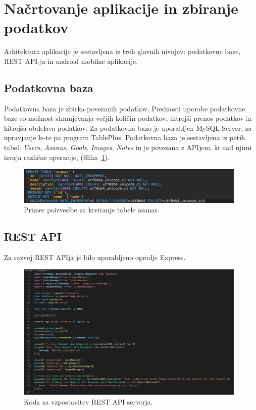 \documentclass[a4paper, 12pt]{book}
\begin{document}
\section{Načrtovanje aplikacije in zbiranje podatkov}
Arhitektura aplikacije je sestavljena iz treh glavnih nivojev: podatkovne baze, REST API-ja in android mobilne aplikacije.

\subsection{Podatkovna baza}
Podatkovna baza je zbirka povezanih podatkov. Prednosti uporabe podatkovne baze so možnost shranjevanja večjih količin podatkov, hitrejši prenos podatkov in hitrejša obdelava podatkov. Za podatkovno bazo je uporabljen MySQL Server, za upravjanje le-te pa program TablePlus. Podatkovna baza je sestavljena iz petih tabel: \textit{Users}, \textit{Asanas}, \textit{Goals}, \textit{Images}, \textit{Notes} in je povezana z APIjem, ki nad njimi izvaja različne operacije, (Slika~\ref{query}).

\begin{figure}[htbp]
\begin{center}
\includegraphics[scale=.55]{query.jpg}
\end{center}
\caption{Primer poizvedbe za kreiranje tabele asanas.}
\label{query}
\end{figure}

\subsection{REST API}
Za razvoj REST APIja je bilo uporabljeno ogrodje Express. 

\begin{figure}[htbp]
\begin{center}
\includegraphics[scale=0.33]{server.jpg} 
\end{center}
\caption{Koda za vzpostavitev REST API serverja.}
\label{server}
\end{figure}
\end{document}
